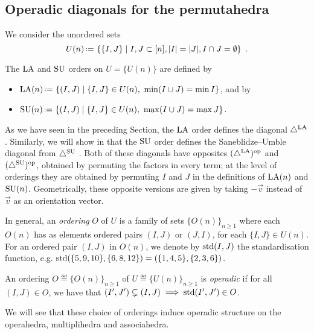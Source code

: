 

\subsection{Operadic diagonals for the permutahedra}

We consider the unordered sets $$U(n)  \eqdef  \set{\{I,J\}}{I,J \subset [n], |I|= |J|, I\cap J = \emptyset} \ . $$

\begin{definition}
The $\mathrm{LA}$ and $\mathrm{SU}$ orders on $U=\{U(n)\}$ are defined by 
\begin{itemize} 
    \item $\LA(n) \eqdef \set{(I,J)}{\{I,J\} \in U(n), \ \min(I\cup J) = \min I}$, and by 
    \item $\SU(n) \eqdef \set{(I,J)}{\{I,J\} \in U(n), \ \max(I\cup J) = \max J}$.
\end{itemize}
\end{definition}

As we have seen in the preceding Section, the $\mathrm{LA}$ order defines the diagonal $\triangle^{\mathrm{LA}}$. 
Similarly, we will show in  that the $\mathrm{SU}$ order defines the Saneblidze--Umble diagonal from $\triangle^{\mathrm{SU}}$ \cite{SaneblidzeUmble04}.
Both of these diagonals have opposites $(\triangle^{\mathrm{LA}})^{\mathrm{op}}$ and $(\triangle^{\mathrm{SU}})^{\mathrm{op}}$, obtained by permuting the factors in every term; at the level of orderings they are obtained by permuting $I$ and $J$ in the definitions of $\mathrm{LA}(n)$ and $\mathrm{SU}(n)$. 
Geometrically, these opposite versions are given by taking $-\vec v$ instead of $\vec v$ as an orientation vector. 

In general, an \emph{ordering} $O$ of $U$ is a family of sets $\{O(n)\}_{n\geq 1}$ where each $O(n)$ has as elements ordered pairs $(I,J)$ or $(J,I)$, for each $\{I,J\} \in U(n)$.
For an ordered pair $(I,J)$ in $O(n)$, we denote by $\operatorname{std}(I,J)$ the standardisation function, e.g. $\operatorname{std}(\{5,9,10\},\{6,8,12\}) = (\{1,4,5\},\{2,3,6\})$.

\begin{definition}
    \label{def:operadic-ordering}
An ordering $O \eqdef \{O(n)\}_{n \geq 1}$ of $U \eqdef \{U(n)\}_{n\geq 1}$ is \emph{operadic} if for all $(I,J) \in O$, we have that $(I',J') \subsetneq (I,J) \implies \operatorname{std}(I',J') \in O$. 
\end{definition}

We will see  that these choice of orderings induce operadic structure on the operahedra, multiplihedra and associahedra.

